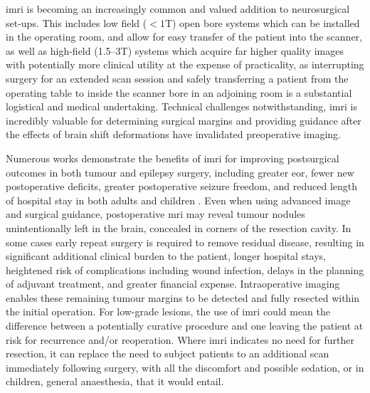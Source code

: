 \Gls{imri} is becoming an increasingly common and valued addition to neurosurgical set-ups.
This includes low field ($<1$T) open bore systems which can be installed in the operating room, and allow for easy transfer of the patient into the scanner\autocite{Steinmeier1998,Senft2010}, as well as high-field (1.5--3T) systems which acquire far higher quality images with potentially more clinical utility\autocite{Makary2011} at the expense of practicality, as interrupting surgery for an extended scan session and safely transferring a patient from the operating table to inside the scanner bore in an adjoining room is a substantial logistical and medical undertaking\autocite{Senft2010,Giordano2016a,Sattur2019}.
Technical challenges notwithstanding, \gls{imri} is incredibly valuable for determining surgical margins and providing guidance after the effects of brain shift deformations have invalidated preoperative imaging.

Numerous works demonstrate the benefits of \gls{imri} for improving postsurgical outcomes in both tumour and epilepsy surgery, including greater \gls{eor}, fewer new postoperative deficits, greater postoperative seizure freedom, and reduced length of hospital stay in both adults and children
\autocite{Shah2012,Zhang2015a,Sacino2016,Rao2017c,Giordano2017,Lu2018a,Garzon-Muvdi2019,Leroy2019,Karsy2019,Golub2020,Hlavac2020,Englman2021}.
Even when using advanced image and surgical guidance, postoperative \gls{mri} may reveal tumour nodules unintentionally left in the brain, concealed in corners of the resection cavity.
In some cases early repeat surgery is required to remove residual disease, resulting in significant additional clinical burden to the patient, longer hospital stays, heightened risk of complications including wound infection\autocite{Tenney1985,Chang2003}, delays in the planning of adjuvant treatment, and greater financial expense\autocite{Shah2012}.
Intraoperative imaging enables these remaining tumour margins to be detected and fully resected within the initial operation\autocite{Sattur2019,Hlavac2020}.
For low-grade lesions, the use of \gls{imri} could mean the difference between a potentially curative procedure and one leaving the patient at risk for recurrence and/or reoperation\autocite{Shah2012}.
Where \gls{imri} indicates no need for further resection, it can replace the need to subject patients to an additional scan immediately following surgery, with all the discomfort and possible sedation, or in children, general anaesthesia, that it would entail.

